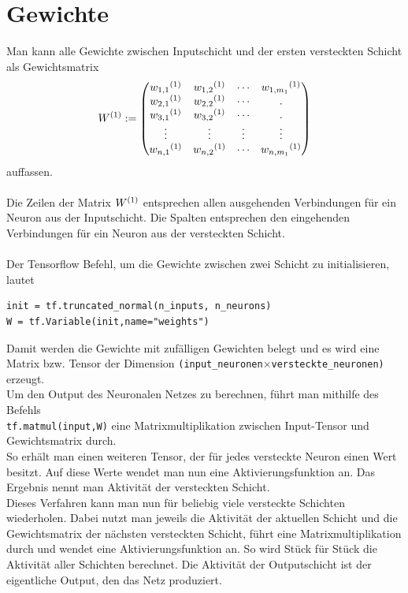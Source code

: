 \section{Gewichte}
Man kann alle Gewichte zwischen Inputschicht und der ersten versteckten Schicht als Gewichtsmatrix \begin{equation}
W\textsuperscript{(1)}:=
\begin{pmatrix}
w_{1,1}\textsuperscript{(1)} & w_{1,2}\textsuperscript{(1)} & \cdots & w_{1,m_1}\textsuperscript{(1)} \\
w_{2,1}\textsuperscript{(1)} & w_{2,2}\textsuperscript{(1)}& \cdots & .\\
w_{3,1}\textsuperscript{(1)} & w_{3,2}\textsuperscript{(1)}& \cdots & .\\
\vdots & \vdots & \vdots & \vdots \\
w_{n,1}\textsuperscript{(1)} & w_{n,2}\textsuperscript{(1)} & \cdots & w_{n,m_1}\textsuperscript{(1)}\\
\end{pmatrix} \end{equation}
auffassen.\\\\
Die Zeilen der Matrix $W\textsuperscript{(1)}$ entsprechen allen ausgehenden Verbindungen f\"ur ein Neuron aus der Inputschicht. Die Spalten entsprechen den eingehenden Verbindungen f\"ur ein Neuron aus der versteckten Schicht. \\\\
Der Tensorflow Befehl, um die Gewichte zwischen zwei Schicht zu initialisieren, lautet\cite{handson}
\begin{lstlisting}
init = tf.truncated_normal(n_inputs, n_neurons)
W = tf.Variable(init,name="weights")
\end{lstlisting}
Damit werden die Gewichte mit zuf\"alligen Gewichten belegt und es wird eine Matrix bzw. Tensor der Dimension \lstinline$(input_neuronen$$ \times $\lstinline$versteckte_neuronen)$ erzeugt.\\
Um den Output des Neuronalen Netzes zu berechnen, f\"uhrt man mithilfe des Befehls\\ \lstinline$tf.matmul(input,W)$ eine Matrixmultiplikation zwischen Input-Tensor und Gewichtsmatrix durch.\cite{handson} \\
So erhält man einen weiteren Tensor, der f\"ur jedes versteckte Neuron einen Wert besitzt. Auf diese Werte wendet man nun eine Aktivierungsfunktion an. Das Ergebnis nennt man Aktivit\"at \cite{Ertel2013} der versteckten Schicht.\\
Dieses Verfahren kann man nun f\"ur beliebig viele versteckte Schichten wiederholen. Dabei nutzt man jeweils die Aktivit\"at der aktuellen Schicht und die Gewichtsmatrix der nächsten versteckten Schicht, führt eine Matrixmultiplikation durch und wendet eine Aktivierungsfunktion an. So wird Stück für Stück die Aktivit\"at aller Schichten berechnet. Die Aktivität der Outputschicht ist der eigentliche Output, den das Netz produziert.
\newpage
